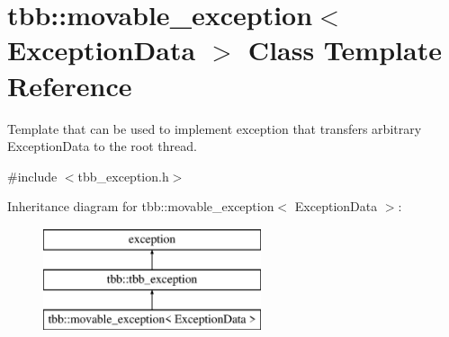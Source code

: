 \hypertarget{classtbb_1_1movable__exception}{}\section{tbb\+:\+:movable\+\_\+exception$<$ Exception\+Data $>$ Class Template Reference}
\label{classtbb_1_1movable__exception}


Template that can be used to implement exception that transfers arbitrary Exception\+Data to the root thread.  




{\ttfamily \#include $<$tbb\+\_\+exception.\+h$>$}

Inheritance diagram for tbb\+:\+:movable\+\_\+exception$<$ Exception\+Data $>$\+:\begin{figure}[H]
\begin{center}
\leavevmode
\includegraphics[height=3.000000cm]{classtbb_1_1movable__exception}
\end{center}
\end{figure}
